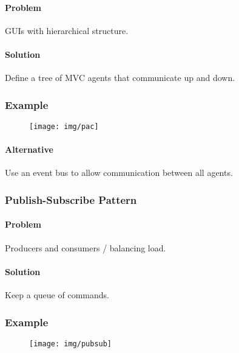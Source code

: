 \documentclass[twocolumn,english]{article}
\begin{document}
\paragraph{Problem}

GUIs with hierarchical structure.


\paragraph{Solution}

Define a tree of MVC agents that communicate up and down.


\subsubsection*{Example}

\begin{figure}[H]
\centering{}\texttt{[image: img/pac]} 
\end{figure}



\paragraph{Alternative}

Use an event bus to allow communication between all agents.


\subsubsection{Publish-Subscribe Pattern}


\paragraph{Problem}

Producers and consumers / balancing load.


\paragraph{Solution}

Keep a queue of commands.


\subsubsection*{Example}

\begin{figure}[H]
\centering{}\texttt{[image: img/pubsub]} 
\end{figure}
\end{document}
